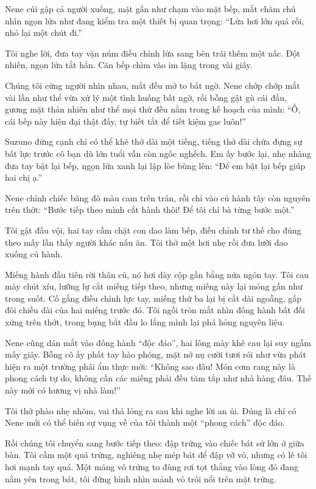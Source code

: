 \documentclass[../main.tex]{subfiles}
\begin{document}
Nene cúi gập cả người xuống, mặt gần như chạm vào mặt bếp, mắt chăm chú nhìn ngọn lửa như đang kiểm tra một thiết bị quan trọng: ``Lửa hơi lớn quá rồi, nhỏ lại một chút đi.''

Tôi nghe lời, đưa tay vặn núm điều chỉnh lửa sang bên trái thêm một nấc. Đột nhiên, ngọn lửa tắt hẳn. Căn bếp chìm vào im lặng trong vài giây.

Chúng tôi cứng người nhìn nhau, mắt đều mở to bất ngờ. Nene chớp chớp mắt vài lần như thể vừa xử lý một tình huống bất ngờ, rồi bỗng gật gù cái đầu, gương mặt thản nhiên như thể mọi thứ đều nằm trong kế hoạch của mình: ``Ồ, cái bếp này hiện đại thật đấy, tự biết tắt để tiết kiệm gas luôn!''

Suzuno đứng cạnh chỉ có thể khẽ thở dài một tiếng, tiếng thở dài chứa đựng sự bất lực trước cô bạn dù lớn tuổi vẫn còn ngốc nghếch. Em ấy bước lại, nhẹ nhàng đưa tay bật lại bếp, ngọn lửa xanh lại lập lòe bùng lên: ``Để em bật lại bếp giúp hai chị ạ.''

Nene chỉnh chiếc băng đô màu cam trên trán, rồi chỉ vào củ hành tây còn nguyên trên thớt: ``Bước tiếp theo mình cắt hành thôi! Để tôi chỉ bà từng bước một.''

Tôi gật đầu vội, hai tay cầm chặt con dao làm bếp, điều chỉnh tư thế cho đúng theo mấy lần thấy người khác nấu ăn. Tôi thở một hơi nhẹ rồi đưa lưỡi dao xuống củ hành.

Miếng hành đầu tiên rời thân củ, nó hơi dày cộp gần bằng nửa ngón tay. Tôi cau mày chút xíu, lưỡng lự cắt miếng tiếp theo, nhưng miếng này lại mỏng gần như trong suốt. Cố gắng điều chỉnh lực tay, miếng thứ ba lại bị cắt dài ngoẵng, gấp đôi chiều dài của hai miếng trước đó. Tôi ngồi tròn mắt nhìn đống hành bất đối xứng trên thớt, trong bụng bắt đầu lo lắng mình lại phá hỏng nguyên liệu.

Nene cũng dán mắt vào đống hành ``độc đáo'', hai lông mày khẽ cau lại suy ngẫm mấy giây. Bỗng cô ấy phất tay hào phóng, mặt nở nụ cười tươi rói như vừa phát hiện ra một trường phái ẩm thực mới: ``Không sao đâu! Món cơm rang này là phong cách tự do, không cần các miếng phải đều tăm tắp như nhà hàng đâu. Thế này mới có hương vị nhà làm!''

Tôi thở phào nhẹ nhõm, vai thả lỏng ra sau khi nghe lời an ủi. Đúng là chỉ có Nene mới có thể biến sự vụng về của tôi thành một ``phong cách'' độc đáo.

Rồi chúng tôi chuyển sang bước tiếp theo: đập trứng vào chiếc bát sứ lớn ở giữa bàn. Tôi cầm một quả trứng, nghiêng nhẹ mép bát để đập vỡ vỏ, nhưng có lẽ tôi hơi mạnh tay quá. Một mảng vỏ trứng to đùng rơi tọt thẳng vào lòng đỏ đang nằm yên trong bát, tôi đứng hình nhìn mảnh vỏ trôi nổi trên mặt trứng.
\end{document}
